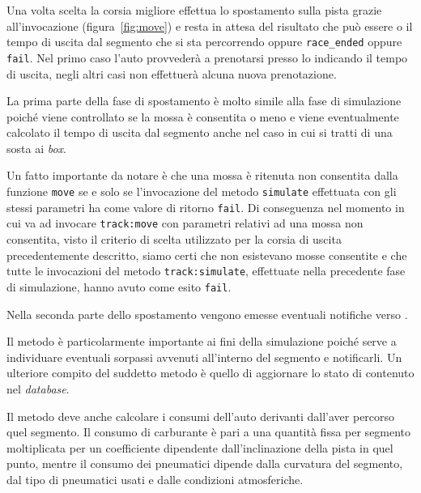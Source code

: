 Una volta scelta la corsia migliore \car{} effettua lo spostamento sulla pista grazie all'invocazione  (figura~\ref{fig:move}) e resta in attesa del risultato che può essere o il tempo di uscita dal segmento che si sta percorrendo oppure \texttt{race\_ended} oppure \texttt{fail}. Nel primo caso l'auto provvederà a prenotarsi presso lo \sched{} indicando il tempo di uscita, negli altri casi \car{} non effettuerà alcuna nuova prenotazione.

La prima parte della fase di spostamento è molto simile alla fase di simulazione poiché viene controllato se la mossa è consentita o meno e viene eventualmente calcolato il tempo di uscita dal segmento anche nel caso in cui si tratti di una sosta ai \textit{box}.

Un fatto importante da notare è che una mossa è ritenuta non consentita dalla funzione \texttt{move} se e solo se l'invocazione del metodo \texttt{simulate} effettuata con gli stessi parametri ha come valore di ritorno \texttt{fail}.
Di conseguenza nel momento in cui \car{} va ad invocare \texttt{track:move} con parametri relativi ad una mossa non consentita, visto il criterio di scelta utilizzato per la corsia di uscita precedentemente descritto, siamo certi che non esistevano mosse consentite e che tutte le invocazioni del metodo \texttt{track:simulate}, effettuate nella precedente fase di simulazione, hanno avuto come esito \texttt{fail}.

Nella seconda parte dello spostamento vengono emesse eventuali notifiche verso \evdisp{}.

Il metodo  è particolarmente importante ai fini della simulazione poiché serve a individuare eventuali sorpassi avvenuti all'interno del segmento e notificarli. Un ulteriore compito del suddetto metodo è quello di aggiornare lo stato di \track{} contenuto nel \textit{database}.

Il metodo  deve anche calcolare i consumi dell'auto derivanti dall'aver percorso quel segmento.
Il consumo di carburante è pari a una quantità fissa per segmento moltiplicata per un coefficiente dipendente dall'inclinazione della pista in quel punto, mentre il consumo dei pneumatici dipende dalla curvatura del segmento, dal tipo di pneumatici usati e dalle condizioni atmosferiche.

